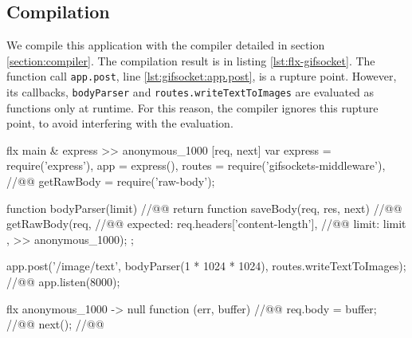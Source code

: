 
\subsection{Compilation}

We compile this application with the compiler detailed in section \ref{section:compiler}.
The compilation result is in listing \ref{lst:flx-gifsocket}.
The function call \texttt{app.post}, line \ref{lst:gifsocket:app.post}, is a rupture point.
However, its callbacks, \texttt{bodyParser} and \texttt{routes.write\-Text\-To\-Images} are evaluated as functions only at runtime.
For this reason, the compiler ignores this rupture point, to avoid interfering with the evaluation.


\begin{code}[flx, caption={Compilation result of gifsockets-server},label={lst:flx-gifsocket}]
flx main & express
>> anonymous_1000 [req, next]
  var express = require('express'),
      app = express(),
      routes = require('gifsockets-middleware'), //@\label{lst:flx-gifsocket:gif-mw}@
      getRawBody = require('raw-body');

  function bodyParser(limit) { //@\label{lst:flx-gifsocket:bodyParser}@
    return function saveBody(req, res, next) { //@\label{lst:flx-gifsocket:saveBody}@
      getRawBody(req, { //@\label{lst:flx-gifsocket:getRawBody}@
        expected: req.headers['content-length'], //@\label{lst:flx-gifsocket:req.headers}@
        limit: limit
      }, >> anonymous_1000);
    };
  }

  app.post('/image/text', bodyParser(1 * 1024 * 1024), routes.writeTextToImages); //@\label{lst:flx-gifsocket:app.post}@
  app.listen(8000);

flx anonymous_1000
-> null
  function (err, buffer) { //@\label{lst:flx-gifsocket:callback}@
    req.body = buffer; //@\label{lst:flx-gifsocket:buffer}@
    next(); //@\label{lst:flx-gifsocket:next}@
  }
\end{code}

